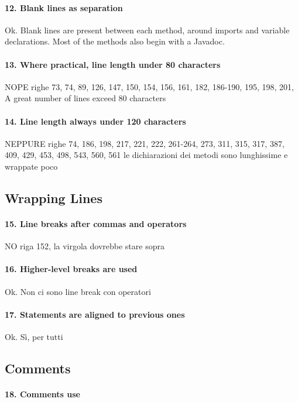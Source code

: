 \documentclass[english]{article}
\begin{document}
\paragraph{12. Blank lines as separation}
Ok.
Blank lines are present between each method, around imports and variable declarations.
Most of the methods also begin with a Javadoc.

\paragraph{13. Where practical, line length under 80 characters}
NOPE
righe 73, 74, 89, 126, 147, 150, 154, 156, 161, 182, 186-190, 195, 198, 201, 
A great number of lines exceed 80 characters

\paragraph{14. Line length always under 120 characters}
NEPPURE
righe 74, 186, 198, 217, 221, 222, 261-264, 273, 311, 315, 317, 387, 409, 429, 453, 498, 543, 560, 561
le dichiarazioni dei metodi sono lunghissime e wrappate poco

\subsection{Wrapping Lines}
\paragraph{15. Line breaks after commas and operators}
NO
riga 152, la virgola dovrebbe stare sopra %

\paragraph{16. Higher-level breaks are used}
Ok.
Non ci sono line break con operatori

\paragraph{17. Statements are aligned to previous ones}
Ok.
Sì, per tutti

\subsection{Comments}

\paragraph{18. Comments use}
\end{document}
